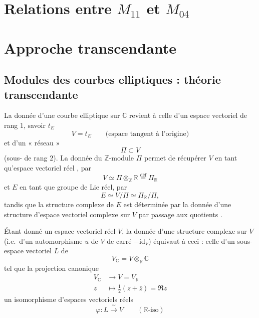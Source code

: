\documentclass[11pt,a4paper]{article}
\begin{document}
\section{Relations entre $M_{11}$ et $M_{04}$}

\section{Approche transcendante}

\subsection{Modules des courbes elliptiques : théorie transcendante}

La donnée d'une courbe elliptique  sur $\mathbb{C}$ revient à celle d'un
espace vectoriel de rang $1$, savoir $t_E$
\[
  V = t_E \qquad \text{(espace tangent à l'origine)} \tag{1}
\]
et d'un « réseau »
\[
  \Pi \subset V \tag{2}
\]
(sous-  
 de rang $2$). La donnée du  $\mathbb{Z}$-module
$\Pi$ permet de récupérer $V$ en tant qu'espace vectoriel réel , par
\[
  V \simeq \Pi \otimes_{\mathbb{Z}} \mathbb{R} \overset{\text{déf}}{=} \Pi_{\mathbb{R}} \tag{3}
\]
et $E$ en tant que groupe de Lie réel, par
\[
  E \simeq V/\Pi \simeq \Pi_{\mathbb{R}}/\Pi , \tag{4}
\]
tandis que la structure complexe de $E$ est déterminée par la donnée d'une structure
d'espace vectoriel complexe sur $V$ par passage aux quotients .

Étant donné un espace vectoriel réel $V$, la donnée d'une structure complexe sur $V$
(i.e.\ d'un automorphisme $u$ de $V$ de carré $-\mathrm{id}_V$) équivaut à ceci : celle
d'un sous-espace vectoriel $L$ de \struck{\ill{}} 
\[
  V_{\mathbb{C}} = V \otimes_{\mathbb{R}} \mathbb{C} \tag{5}
\]
tel que la projection canonique
\[
  \begin{aligned}
    V_{\mathbb{C}} &\longrightarrow V = V_{\mathbb{R}} \\
    z &\longmapsto \tfrac{1}{2}(z + \bar z) = \Re z
  \end{aligned} \tag{6}
\]
  un isomorphisme d'espaces vectoriels réels
\[
  \varphi : L \xrightarrow{\;\sim\;} V \qquad (\mathbb{R}\text{-iso}) \tag{7}
\]
\end{document}
